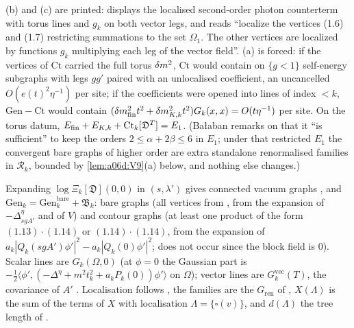 (b) and (c) are printed: \cite[(1.31), p.~419]{Ba3} displays the localised second-order photon counterterm with torus lines and $g_k$ on both vector legs, and \cite[p.~419]{Ba3} reads ``localize the vertices (1.6) and (1.7) restricting summations to the set $\Omega_1$. The other vertices are localized by functions $g_k$ multiplying each leg of the vector field''. (a) is forced: if the \cite[(1.7)]{Ba3} vertices of $\mathrm{Ct}$ carried the full torus $\delta m^2$, $\mathrm{Ct}$ would contain on $\{g<1\}$ self-energy subgraphs with legs $gg'$ paired with an unlocalised coefficient, an uncancelled $O(e(t)^2\eta^{-1})$ per site; if the coefficients were opened into lines of index $<k$, $\mathrm{Gen}-\mathrm{Ct}$ would contain $(\delta m^2_{\mathrm{fin}}t^2+\delta m^2_{K,k}t^2)G_k(x,x)=O(t\eta^{-1})$ per site. On the torus datum, $E_{\mathrm{fin}}+E_{K,k}+\mathrm{Ct}_k[\mathfrak D^T]=E_1$. (Ba{\l}aban remarks on \cite[p.~418]{Ba3} that it ``is sufficient'' to keep the orders $2\le\alpha+2\beta\le6$ in $E_1$; under that restricted $E_1$ the convergent bare graphs of higher order are extra standalone renormalised families in $\mathcal R_k$, bounded by \cref{lem:a06d:V9}(a) below, and nothing else changes.)

\begin{definition}\label{def:a06d:V4}
Expanding $\log\Xi_k[\mathfrak D](0,0)$ in $(s,\lambda')$ gives connected vacuum graphs \cite[pp.~414--415]{Ba3}, and $\mathrm{Gen}_k=\mathrm{Gen}^{\mathrm{bare}}_k+\mathfrak B_k$: bare graphs (all vertices from \cite[(1.6), (1.7), (1.8), (1.10)]{Ba3}, from the expansion of $-\Delta^\eta_{sgA'}$ and of $V$) and contour graphs (at least one product \cite[(1.18)]{Ba3} of the form $(1.13)\cdot(1.14)$ or $(1.14)\cdot(1.14)$, from the expansion of $a_k|Q_k(sgA')\phi'|^2-a_k|Q_k(0)\phi'|^2$; \cite[(1.12)]{Ba3} does not occur since the block field is $0$). Scalar lines are $G_k(\Omega,0)$ (at $\phi=0$ the Gaussian part is $-\frac12\langle\phi',(-\Delta^\eta+m^2t_k^2+a_kP_k(0))\phi'\rangle$ on $\Omega$); vector lines are $G^{\mathrm{vec}}_k(T)$, the covariance of $A'$ \cite[p.~414]{Ba3}. Localisation follows \cite[p.~420]{Ba3}, the families are the $G_{\mathrm{ren}}$ of \cite[p.~420]{Ba3}, $X(\Lambda)$ is the sum of the terms of $X$ with localisation $\Lambda=\{\square(v)\}$, and $d(\Lambda)$ the tree length of \cite[(1.33)]{Ba3}.
\end{definition}

